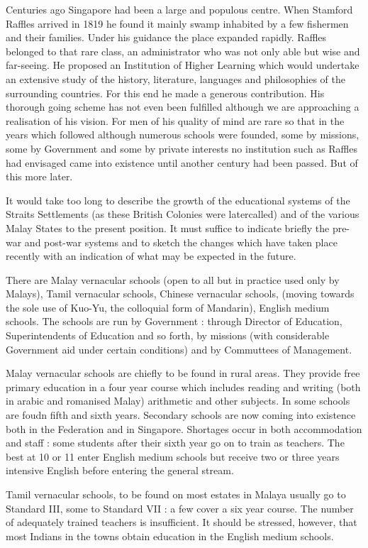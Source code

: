 Centuries ago Singapore had been a large and populous centre. When Stamford Raffles arrived in 1819 he found it mainly swamp inhabited by a few fishermen and their families. Under his guidance the place expanded rapidly. Raffles belonged to that rare class, an administrator who was not only able but wise and far-seeing. He proposed an Institution of Higher Learning which would undertake an extensive study of the history, literature, languages and philosophies of the surrounding countries. For this end he made a generous contribution. His thorough going scheme has not even been fulfilled although we are approaching a realisation of his vision. For men of his quality of mind are rare so that in the years which followed although numerous schools were founded, some by missions, some by Government and some by private interests no institution such as Raffles had envisaged came into existence until another century had been passed. But of this more later.

It would take too long to describe the growth of the educational systems of the Straits Settlements (as these British Colonies were later\pageoriginale called) and of the various Malay States to the present position. It must suffice to indicate briefly the pre-war and post-war systems and to sketch the changes which have taken place recently with an indication of what may be expected in the future.

There are Malay vernacular schools (open to all but in practice used only by Malays), Tamil vernacular schools, Chinese vernacular schools, (moving towards the sole use of Kuo-Yu, the colloquial form of Mandarin), English medium schools. The schools are run by Government : through Director of Education, Superintendents of Education and so forth, by missions (with considerable Government aid under certain conditions) and by Commuttees of Management.

Malay vernacular schools are chiefly to be found in rural areas. They provide free primary education in a four year course which includes reading and writing (both in arabic and romanised Malay) arithmetic and other subjects. In some schools are foudn fifth and sixth years. Secondary schools are now coming into existence both in the Federation and in Singapore. Shortages occur in both accommodation and staff : some students after their sixth year go on to train as teachers. The best at 10 or 11 enter English medium schools but receive two or three years intensive English before entering the general stream.

Tamil vernacular schools, to be found on most estates in Malaya usually go to Standard III, some to Standard VII : a few cover a six year course. The number of adequately trained teachers is insufficient. It should be stressed, however, that most Indians in the towns obtain education in the English medium schools.

